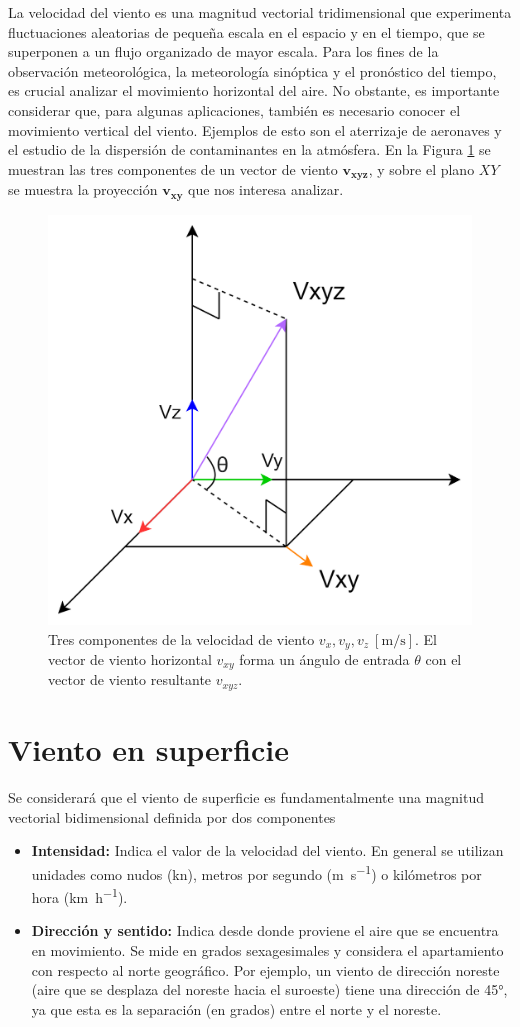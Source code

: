  La velocidad del viento es una magnitud vectorial tridimensional que experimenta fluctuaciones aleatorias de pequeña escala en el espacio y en el tiempo, que se superponen a un flujo organizado de mayor escala. Para los fines de la observación meteorológica, la meteorología sinóptica y el pronóstico del tiempo, es crucial analizar el movimiento horizontal del aire. No obstante, es importante considerar que, para algunas aplicaciones, también es necesario conocer el movimiento vertical del viento. Ejemplos de esto son el aterrizaje de aeronaves y el estudio de la dispersión de contaminantes en la atmósfera. En la Figura \ref{fig:vectorVelocidad} se muestran las tres componentes de un vector de viento $\mathbf{v_{xyz}}$, y sobre el plano $XY$ se muestra la proyección $\mathbf{v_{xy}}$ que nos interesa analizar.

\begin{figure}[H]
    \centering
    \includegraphics[width=0.5\linewidth]{Figuras/introduccion/vectorVelocidad.png}
    \caption{Tres componentes de la velocidad de viento $v_{x}, v_{y}, v_{z}\  [\unit{\meter\per\second}]$. El vector de viento horizontal $v_{xy}$ forma un ángulo de entrada $\theta$ con el vector de viento resultante $v_{xyz}$.} 
    \label{fig:vectorVelocidad}
\end{figure}
\section{Viento en superficie}\label{sec:vientoEnSuperficie}
Se considerará que el viento de superficie es fundamentalmente una magnitud vectorial bidimensional definida por dos componentes
\begin{itemize}
    \item \textbf{Intensidad:} Indica el valor de la velocidad del viento. En general se utilizan unidades como nudos (\unit{\knot}), metros por segundo (\unit{\meter\per\second}) o kilómetros por hora (\unit{\kilo\meter\per\hour}).
    \item \textbf{Dirección y sentido:} Indica desde donde proviene el aire que se encuentra en movimiento. Se mide en grados sexagesimales y considera el apartamiento con respecto al norte geográfico. Por ejemplo, un viento de dirección noreste (aire que se desplaza del noreste hacia el suroeste) tiene una dirección de 45°, ya que esta es la separación (en grados) entre el norte y el noreste.
\end{itemize}

